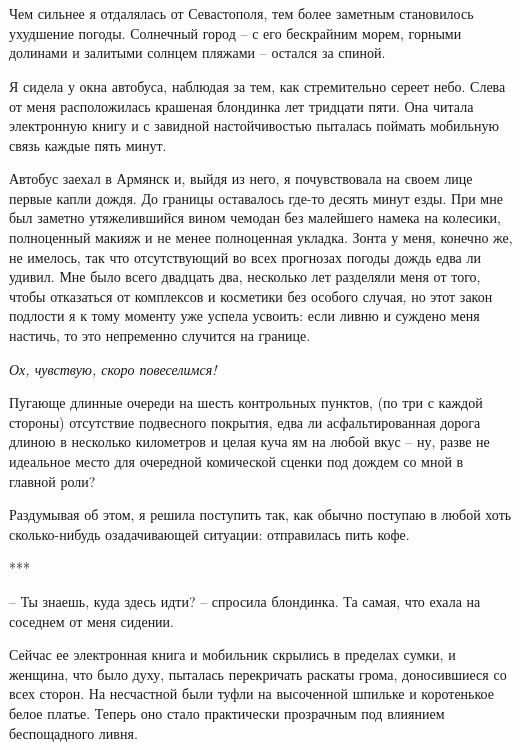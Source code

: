 \documentclass[
]{book}
\begin{document}
\hypertarget{chapter-39}{%
\chapter{~}\label{chapter-39}}

Чем сильнее я отдалялась от Севастополя, тем более заметным становилось ухудшение погоды. Солнечный город -- с его бескрайним морем, горными долинами и залитыми солнцем пляжами -- остался за спиной.

Я сидела у окна автобуса, наблюдая за тем, как стремительно сереет небо. Слева от меня расположилась крашеная блондинка лет тридцати пяти. Она читала электронную книгу и с завидной настойчивостью пыталась поймать мобильную связь каждые пять минут.

Автобус заехал в Армянск и, выйдя из него, я почувствовала на своем лице первые капли дождя. До границы оставалось где-то десять минут езды. При мне был заметно утяжелившийся вином чемодан без малейшего намека на колесики, полноценный макияж и не менее полноценная укладка. Зонта у меня, конечно же, не имелось, так что отсутствующий во всех прогнозах погоды дождь едва ли удивил. Мне было всего двадцать два, несколько лет разделяли меня от того, чтобы отказаться от комплексов и косметики без особого случая, но этот закон подлости я к тому моменту уже успела усвоить: если ливню и суждено меня настичь, то это непременно случится на границе.

\emph{Ох, чувствую, скоро повеселимся!}

Пугающе длинные очереди на шесть контрольных пунктов, (по три с каждой стороны) отсутствие подвесного покрытия, едва ли асфальтированная дорога длиною в несколько километров и целая куча ям на любой вкус -- ну, разве не идеальное место для очередной комической сценки под дождем со мной в главной роли?

Раздумывая об этом, я решила поступить так, как обычно поступаю в любой хоть сколько-нибудь озадачивающей ситуации: отправилась пить кофе.

***

-- Ты знаешь, куда здесь идти? -- спросила блондинка. Та самая, что ехала на соседнем от меня сидении.

Сейчас ее электронная книга и мобильник скрылись в пределах сумки, и женщина, что было духу, пыталась перекричать раскаты грома, доносившиеся со всех сторон. На несчастной были туфли на высоченной шпильке и коротенькое белое платье. Теперь оно стало практически прозрачным под влиянием беспощадного ливня.
\end{document}
